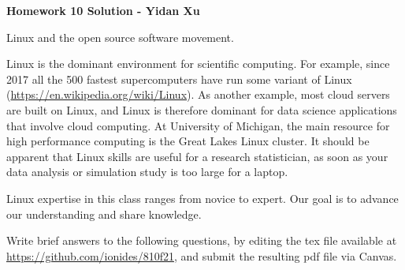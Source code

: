 \documentclass[12pt]{article}
\begin{document}
\begin{center}\bf
Homework 10 Solution - Yidan Xu

Linux and the open source software movement.

\end{center}

Linux is the dominant environment for scientific computing. For example, since 2017 all the 500 fastest  supercomputers have run some variant of Linux (\url{https://en.wikipedia.org/wiki/Linux}). As another example, most cloud servers are built on Linux, and Linux is therefore dominant for data science applications that involve cloud computing. At University of Michigan, the main resource for high performance computing is the Great Lakes Linux cluster. It should be apparent that Linux skills are useful for a research statistician, as soon as your data analysis or simulation study is too large for a laptop.

Linux expertise in this class ranges from novice to expert. Our goal is to advance our understanding and share knowledge.

Write brief answers to the following questions, by editing the tex file available at \url{https://github.com/ionides/810f21}, and submit the resulting pdf file via Canvas.
\end{document}
